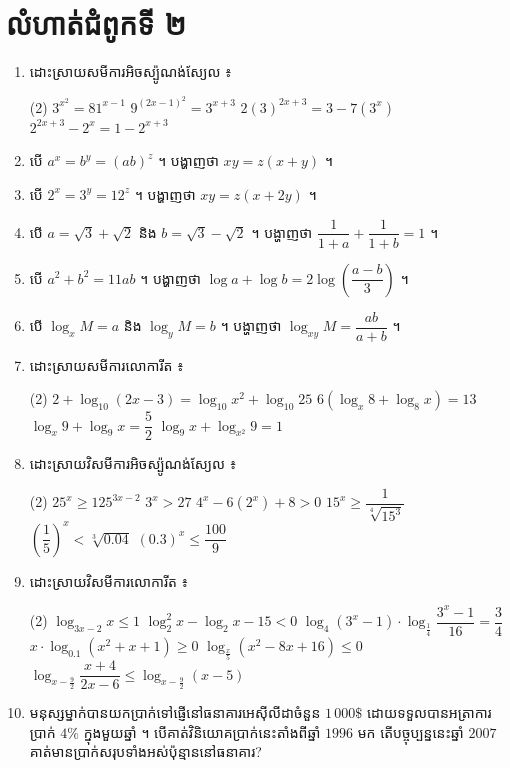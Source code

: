 \section*{លំហាត់ជំពូកទី ២}
\begin{enumerate}[1]
  \item ដោះស្រាយសមីការអិចស្ប៉ូណង់ស្យែល ៖
  \begin{tasks}(2)
    \task $3^{x^2} = 81^{x - 1}$
    \task $9^{(2x - 1)^2} = 3^{x + 3}$
    \task $2(3)^{2x + 3} = 3 - 7(3^x)$
    \task $2^{2x + 3} - 2^x = 1 - 2^{x + 3}$
  \end{tasks}
  \item បើ $a^x = b^y = (ab)^z$ ។ បង្ហាញថា $xy = z(x + y)$ ។
  \item បើ $2^x = 3^y = 12^z$ ។ បង្ហាញថា $xy = z(x + 2y)$ ។
  \item បើ $a = \sqrt{3} + \sqrt{2}$ និង $b = \sqrt{3} - \sqrt{2}$ ។ បង្ហាញថា $\dfrac{1}{1 + a} + \dfrac{1}{1 + b} = 1$ ។
  \item បើ $a^2 + b^2 = 11ab$ ។ បង្ហាញថា $\log a + \log b = 2\log\left(\dfrac{a - b}{3}\right)$ ។
  \item បើ $\log_x M = a$ និង $\log_y M = b$ ។ បង្ហាញថា $\log_{xy} M = \dfrac{ab}{a + b}$ ។
  \item ដោះស្រាយសមីការលោការីត ៖
  \begin{tasks}(2)
    \task $2 + \log_{10}(2x - 3) = \log_{10} x^2 + \log_{10} 25$
    \task $6(\log_x 8 + \log_8 x) = 13$
    \task $\log_x 9 + \log_9 x = \dfrac{5}{2}$
    \task $\log_9 x + \log_{x^2} 9 = 1$
  \end{tasks}
  \item ដោះស្រាយវិសមីការអិចស្ប៉ូណង់ស្យែល ៖
  \begin{tasks}(2)
    \task $25^x \ge 125^{3x - 2}$
    \task $3^x > 27$
    \task $4^x - 6(2^x) + 8 > 0$
    \task $15^x \ge \dfrac{1}{\sqrt[4]{15^3}}$
    \task $\left(\dfrac{1}{5}\right)^x < \sqrt[3]{0.04}$
    \task $(0.3)^x \le \dfrac{100}{9}$
  \end{tasks}
  \item ដោះស្រាយវិសមីការលោការីត ៖
  \begin{tasks}(2)
    \task $\log_{3x - 2} x \le 1$
    \task $\log_2^2 x - \log_2 x - 15 < 0$
    \task $\log_4(3^x - 1)\cdot\log_{\frac{1}{4}}\dfrac{3^x - 1}{16} = \dfrac{3}{4}$
    \task $x\cdot\log_{0.1}(x^2 + x + 1) \ge 0$
    \task $\log_{\frac{x}{5}}(x^2 - 8x + 16) \le 0$
    \task $\log_{x - \frac{9}{2}}\dfrac{x + 4}{2x - 6} \le \log_{x - \frac{9}{2}}(x - 5)$
  \end{tasks}
  \item មនុស្សម្នាក់បានយកប្រាក់ទៅផ្ញើនៅធនាគារអេស៊ីលីដាចំនួន $1\,000\$$ ដោយទទួលបានអត្រាការប្រាក់ $4\%$ ក្នុងមួយឆ្នាំ ។ បើគាត់វិនិយោគប្រាក់នេះតាំងពីឆ្នាំ $1996$ មក តើបច្ចុប្បន្ននេះឆ្នាំ $2007$ គាត់មានប្រាក់សរុបទាំងអស់ប៉ុន្មាននៅធនាគារ?

\end{enumerate}
